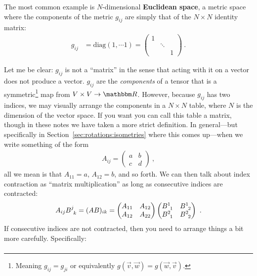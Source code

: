 \documentclass[12pt]{article}
\begin{document}
The most common example is $N$-dimensional \textbf{Euclidean space}, a metric space where the components of the metric $g_{ij}$ are simply that of the $N\times N$ identity matrix:
\begin{align}
    g_{ij} &= \text{diag}(1,\cdots 1) = 
    \begin{pmatrix}
        1 & & \\
        & \ddots & \\
        & & 1
    \end{pmatrix} \ .
\end{align}
% 
\begin{bigidea} \label{idea:treating:two:index:as:matrix}
Let me be clear: $g_{ij}$ is not a ``matrix'' in the sense that acting with it on a vector does not produce a vector. $g_{ij}$ are the \emph{components} of a tensor that is a symmetric\footnote{Meaning $g_{ij}=g_{ji}$ or equivalently $g(\vec{v},\vec{w}) = g(\vec{w},\vec{v})$.} map from $V\times V\to \RR$.
% 
However, because $g_{ij}$ has two indices, we may visually arrange the components in a $N\times N$ table, where $N$ is the dimension of the vector space. If you want you can call this table a matrix, though in these notes we have taken a more strict definition. In general---but specifically in Section~\ref{sec:rotations:isometries} where this comes up---when we write something of the form
\begin{align}
    A_{ij} = 
    \begin{pmatrix}
        a & b \\
        c & d
    \end{pmatrix} \ ,
\end{align}
all we mean is that $A_{11} = a$, $A_{12} = b$, and so forth. We can then talk about index contraction as ``matrix multiplication'' as long as consecutive indices are contracted:
\begin{align}
    A_{ij}B\aij{j}{k} = (AB)_{ik} = 
    \begin{pmatrix}
        A_{11} & A_{12} \\
        A_{12} & A_{22}
    \end{pmatrix}
    \begin{pmatrix}
        B\aij{1}{1} & B\aij{1}{2} \\
        B\aij{2}{1} & B\aij{2}{2}
    \end{pmatrix} \ .
\end{align}
If consecutive indices are not contracted, then you need to arrange things a bit more carefully. Specifically:
\begin{align}

\end{align}
\end{bigidea}
\end{document}
